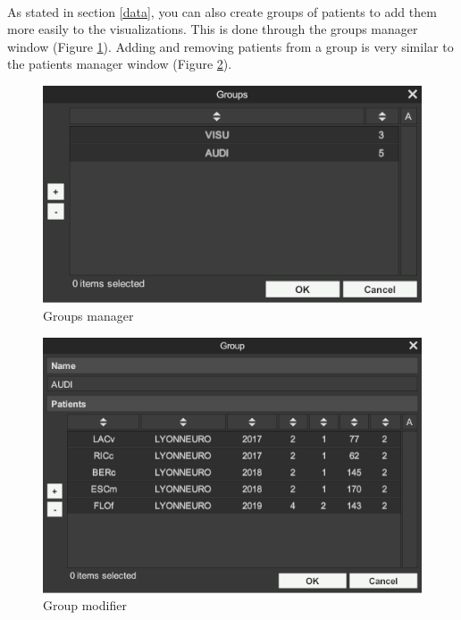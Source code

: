 \documentclass[a4paper]{article}
\begin{document}
\paragraph{} As stated in section \ref{data}, you can also create groups of patients to add them more easily to the visualizations. This is done through the groups manager window (Figure \ref{groupGestionUI}). Adding and removing patients from a group is very similar to the patients manager window (Figure \ref{groupModifierUI}).
\begin{figure}[H]
\begin{center}
\includegraphics[scale=0.5]{GroupGestion.png}
\end{center}
\caption{\label{groupGestionUI}Groups manager}
\end{figure}
\begin{figure}[H]
\begin{center}
\includegraphics[scale=0.5]{GroupModifier.png}
\end{center}
\caption{\label{groupModifierUI}Group modifier}
\end{figure}
\end{document}

